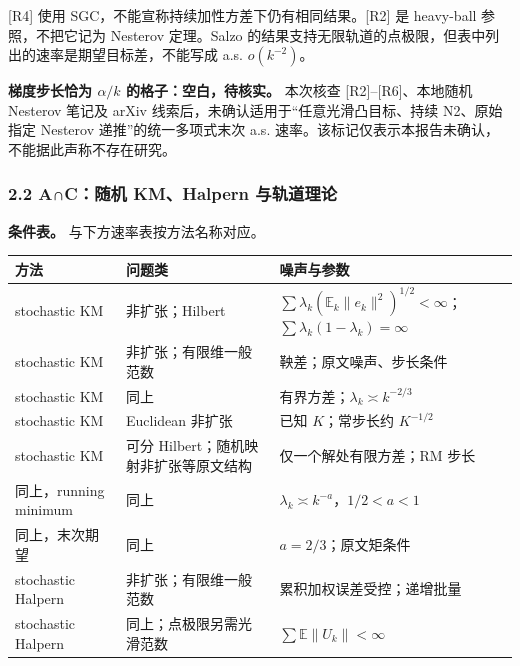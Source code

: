 \documentclass[
  chinese,
  10pt,
  a4paper,
]{article}
\newcounter{none} %
\begin{document}
{[}R4{]} 使用 SGC，不能宣称持续加性方差下仍有相同结果。{[}R2{]} 是
heavy-ball 参照，不把它记为 Nesterov 定理。Salzo
的结果支持无限轨道的点极限，但表中列出的速率是期望目标差，不能写成 a.s.
\(o(k^{-2})\)。

\textbf{梯度步长恰为 \(\alpha/k\) 的格子：空白，待核实。} 本次核查
{[}R2{]}--{[}R6{]}、本地随机 Nesterov 笔记及 arXiv
线索后，未确认适用于``任意光滑凸目标、持续 N2、原始指定 Nesterov
递推''的统一多项式末次 a.s.
速率。该标记仅表示本报告未确认，不能据此声称不存在研究。

\subsubsection{2.2 A∩C：随机 KM、Halpern
与轨道理论}\label{acux968fux673a-kmhalpern-ux4e0eux8f68ux9053ux7406ux8bba}

\textbf{条件表。} 与下方速率表按方法名称对应。

{\def\LTcaptype{none} %
\begin{longtable}[]{@{}
  >{\raggedright\arraybackslash}p{}
  >{\raggedright\arraybackslash}p{}
  >{\raggedright\arraybackslash}p{}@{}}
\toprule\noalign{}
\begin{minipage}[b]{\linewidth}\raggedright
方法
\end{minipage} & \begin{minipage}[b]{\linewidth}\raggedright
问题类
\end{minipage} & \begin{minipage}[b]{\linewidth}\raggedright
噪声与参数
\end{minipage} \\
\midrule\noalign{}
\endhead
\bottomrule\noalign{}
\endlastfoot
stochastic KM & 非扩张；Hilbert &
\(\sum\lambda_k(\mathbb E_k\lVert e_k\rVert^2)^{1/2}<\infty\)；\(\sum\lambda_k(1-\lambda_k)=\infty\) \\
stochastic KM & 非扩张；有限维一般范数 & 鞅差；原文噪声、步长条件 \\
stochastic KM & 同上 & 有界方差；\(\lambda_k\asymp k^{-2/3}\) \\
stochastic KM & Euclidean 非扩张 & 已知 \(K\)；常步长约 \(K^{-1/2}\) \\
stochastic KM & 可分 Hilbert；随机映射非扩张等原文结构 &
仅一个解处有限方差；RM 步长 \\
同上，running minimum & 同上 &
\(\lambda_k\asymp k^{-a}\)，\(1/2<a<1\) \\
同上，末次期望 & 同上 & \(a=2/3\)；原文矩条件 \\
stochastic Halpern & 非扩张；有限维一般范数 &
累积加权误差受控；递增批量 \\
stochastic Halpern & 同上；点极限另需光滑范数 &
\(\sum\mathbb E\lVert U_k\rVert<\infty\) \\
\end{longtable}
}
\end{document}
